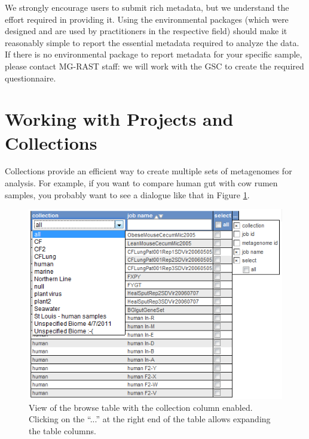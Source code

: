 \documentclass[12pt,fullpage]{report}
\begin{document}
We strongly encourage users to submit rich metadata, but we understand the effort required in providing it. Using the environmental packages (which were designed and are used by practitioners in the respective field) should make it reasonably simple to report the essential metadata required to analyze the data. If there is no environmental package to report metadata for your specific sample, please contact MG-RAST staff: we will work with the GSC\cite{GSC} to create the required questionnaire.
 \section{Working with Projects and Collections}

Collections provide an efficient way to create multiple sets of metagenomes for analysis. For example, if you want to compare human gut with cow rumen samples, you probably want to see a dialogue like that in Figure \ref{fig:collections-total-list1}.

\begin{figure}[ht]
\begin{center}
\includegraphics[width=6in]{Images/collections-total-list1.png}
\end{center}
\caption{
View of the browse table with the collection column enabled. Clicking on the ``...'' at the right end of the table allows expanding the table columns.
}
\label{fig:collections-total-list1}
\end{figure}
\end{document}
